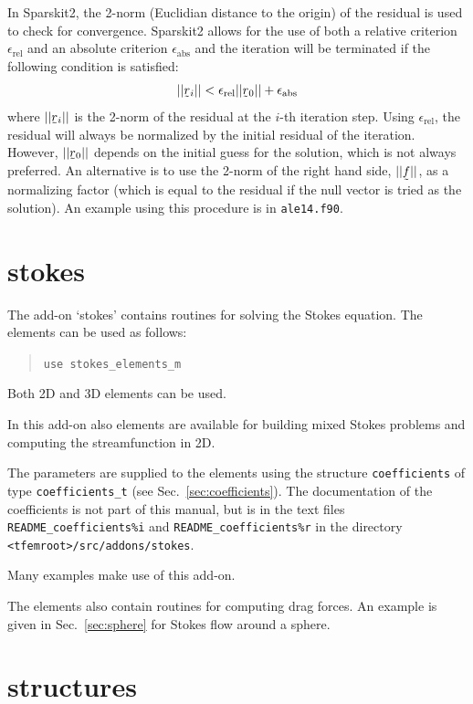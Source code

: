 In Sparskit2, the 2-norm (Euclidian distance to the origin) of the residual is
used to check for convergence. Sparskit2 allows for the use of both a
relative criterion $\epsilon_\text{rel}$ and an absolute
criterion $\epsilon_\text{abs}$ and the iteration will be terminated if the
following condition is satisfied:
\[
 ||\col r_i|| < \epsilon_\text{rel}||\col r_0|| + \epsilon_\text{abs}
\]
where $||\col r_i||$ is the 2-norm of the residual at the $i$-th iteration
step. Using $\epsilon_\text{rel}$, the residual will always be normalized by
the initial residual of the iteration. However, $||\col r_0||$ depends on the
initial guess for the solution, which is not always
preferred. An alternative is to use the 2-norm of the right hand side, $||\col
f||$, as a normalizing factor (which is equal to the residual
if the null vector is tried as the solution). An example using this procedure
is in \texttt{ale14.f90}.

\section{stokes}
\label{sec:stokesaddon}

The add-on `stokes' contains routines for solving the Stokes equation.
The elements can be used as follows:
\begin{quote}
   \texttt{use stokes\_elements\_m}
\end{quote}
Both 2D and 3D elements can be used.

In this add-on also elements are available for building mixed Stokes problems
and computing the streamfunction in 2D.

The parameters are
supplied to the elements using the structure \texttt{coefficients} of type
\texttt{coefficients\_t} (see Sec.~\ref{sec:coefficients}). The documentation
of the coefficients is not part of this manual, but is in the text files
\texttt{README\_coefficients\%i} and
\texttt{README\_coefficients\%r} in the directory
\texttt{<tfemroot>/src/addons/stokes}.

Many examples make use of this add-on.

The elements also contain routines for computing drag forces. An example is
given in Sec.~\ref{sec:sphere} for Stokes flow around a sphere.

\section{structures}
\label{sec:structures_addon}

